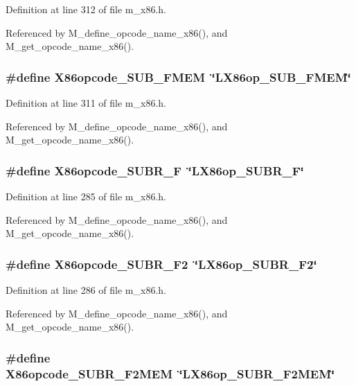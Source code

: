 Definition at line 312 of file m\_\-x86.h.

Referenced by M\_\-define\_\-opcode\_\-name\_\-x86(), and M\_\-get\_\-opcode\_\-name\_\-x86().
\subsubsection{\setlength{\rightskip}{0pt plus 5cm}\#define X86opcode\_\-SUB\_\-FMEM~\char`\"{}LX86op\_\-SUB\_\-FMEM\char`\"{}}\label{m__x86_8h_29ad2cddd978064319d69c1e2a2d3298}




Definition at line 311 of file m\_\-x86.h.

Referenced by M\_\-define\_\-opcode\_\-name\_\-x86(), and M\_\-get\_\-opcode\_\-name\_\-x86().
\subsubsection{\setlength{\rightskip}{0pt plus 5cm}\#define X86opcode\_\-SUBR\_\-F~\char`\"{}LX86op\_\-SUBR\_\-F\char`\"{}}\label{m__x86_8h_8892be1bb59ea0ef228705ea9cf7206c}




Definition at line 285 of file m\_\-x86.h.

Referenced by M\_\-define\_\-opcode\_\-name\_\-x86(), and M\_\-get\_\-opcode\_\-name\_\-x86().
\subsubsection{\setlength{\rightskip}{0pt plus 5cm}\#define X86opcode\_\-SUBR\_\-F2~\char`\"{}LX86op\_\-SUBR\_\-F2\char`\"{}}\label{m__x86_8h_35b84bc12f684e4f374bcfca4b05f8b2}




Definition at line 286 of file m\_\-x86.h.

Referenced by M\_\-define\_\-opcode\_\-name\_\-x86(), and M\_\-get\_\-opcode\_\-name\_\-x86().
\subsubsection{\setlength{\rightskip}{0pt plus 5cm}\#define X86opcode\_\-SUBR\_\-F2MEM~\char`\"{}LX86op\_\-SUBR\_\-F2MEM\char`\"{}}\label{m__x86_8h_51a568edf83d5bd29d9fb50cb82f0a53}




